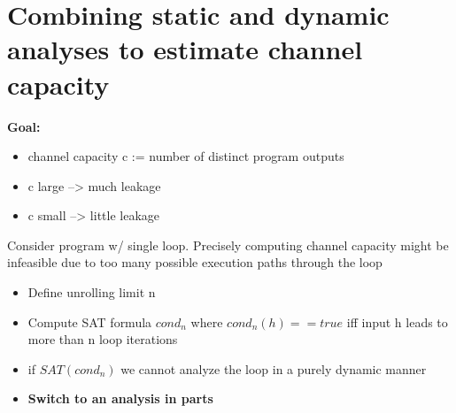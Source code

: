 \section{Combining static and dynamic analyses to estimate channel capacity}
\textbf{Goal:}
\begin{itemize}
    \item channel capacity c := number of distinct program outputs
    \item c large --> much leakage
    \item c small --> little leakage
\end{itemize}
Consider program w/ single loop. Precisely computing channel capacity might be infeasible due to too many possible execution paths through the loop

\begin{itemize}
    \item Define unrolling limit n
    \item Compute SAT formula $cond_n$ where $cond_n(h) == true$ iff input h leads to more than n loop iterations
    \item if $SAT(cond_n)$ we cannot analyze the loop in a purely dynamic manner
    \item \textbf{Switch to an analysis in parts}
\end{itemize}

